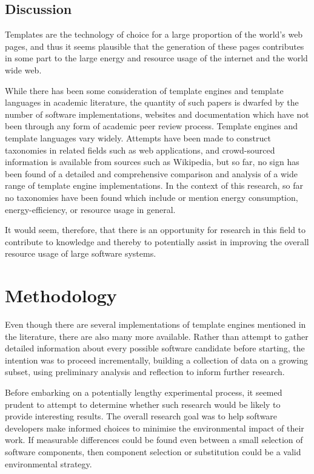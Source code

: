 \subsection{Discussion}

Templates are the technology of choice for a large proportion of the world's web pages, and thus it seems plausible that the generation of these pages contributes in some part to the large energy and resource usage of the internet and the world wide web.

While there has been some consideration of template engines and template languages in academic literature, the quantity of such papers is dwarfed by the number of software implementations, websites and documentation which have not been through any form of academic peer review process. Template engines and template languages vary widely. Attempts have been made to construct taxonomies in related fields such as web applications, and crowd-sourced information is available from sources such as Wikipedia, but so far, no sign has been found of a detailed and comprehensive comparison and analysis of a wide range of template engine implementations. In the context of this research, so far no taxonomies have been found which include or mention energy consumption, energy-efficiency, or resource usage in general.

It would seem, therefore, that there is an opportunity for research in this field to contribute to knowledge and thereby to potentially assist in improving the overall resource usage of large software systems.

\section{Methodology}
\label{fs:methodology}

Even though there are several implementations of template engines mentioned in the literature, there are also many more available. Rather than attempt to gather detailed information about every possible software candidate before starting, the intention was to proceed incrementally, building a collection of data on a growing subset, using preliminary analysis and reflection to inform further research.

Before embarking on a potentially lengthy experimental process, it seemed prudent to attempt to determine whether such research would be likely to provide interesting results. The overall research goal was to help software developers make informed choices to minimise the environmental impact of their work. If measurable differences could be found even between a small selection of software components, then component selection or substitution could be a valid environmental strategy.

